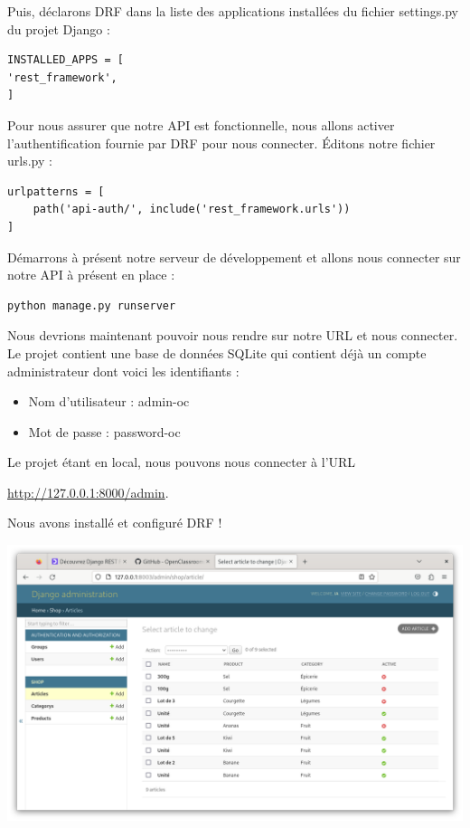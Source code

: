 Puis, déclarons DRF dans la liste des applications installées du fichier  settings.py  du projet Django :
\begin{verbatim}
INSTALLED_APPS = [
'rest_framework',
]
\end{verbatim}

Pour nous assurer que notre API est fonctionnelle, nous allons activer l’authentification fournie par DRF pour nous connecter. Éditons notre fichier  urls.py  :
\begin{verbatim}
urlpatterns = [
    path('api-auth/', include('rest_framework.urls'))
]
\end{verbatim}

Démarrons à présent notre serveur de développement et allons nous connecter sur notre API à présent en place :
\begin{verbatim}
python manage.py runserver
\end{verbatim}

Nous devrions maintenant pouvoir nous rendre sur notre URL et nous connecter. Le projet contient une base de données SQLite qui contient déjà un compte administrateur dont voici les identifiants :
\begin{itemize}
\item Nom d’utilisateur : admin-oc
\item Mot de passe : password-oc
\end{itemize}

Le projet étant en local, nous pouvons nous connecter à l’URL

\url{http://127.0.0.1:8000/admin}.

Nous avons installé et configuré DRF !
\begin{center}
\includegraphics[width=15cm]{images/image04.png}
\end{center}
